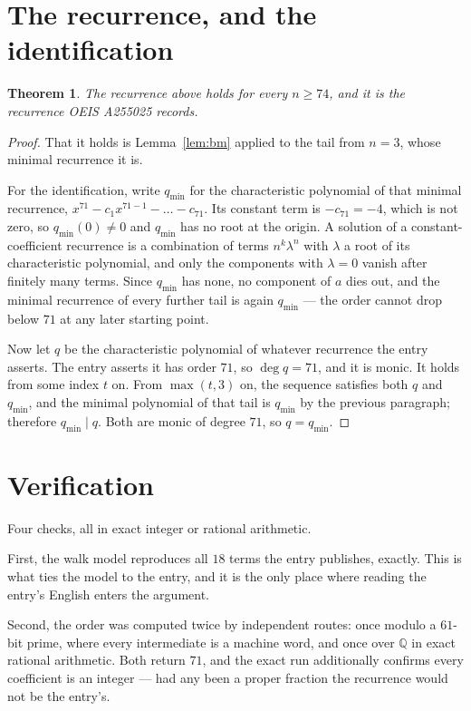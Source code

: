 \documentclass[11pt,a4paper]{article}
\theoremstyle{plain}
\newtheorem{theorem}{Theorem}
\theoremstyle{definition}
\begin{document}
\section{The recurrence, and the identification}

\begin{theorem}
The recurrence above holds for every $n\ge74$, and it is the recurrence OEIS A255025 records.
\end{theorem}

\begin{proof}
That it holds is Lemma~\ref{lem:bm} applied to the tail from $n=3$, whose minimal
recurrence it is.

For the identification, write $q_{\min}$ for the characteristic polynomial of that minimal
recurrence, $x^{71}-c_1x^{71-1}-\dots-c_{71}$. Its constant term is
$-c_{71}=-4$, which is not zero, so $q_{\min}(0)\neq0$ and $q_{\min}$ has no
root at the origin. A solution of a constant-coefficient recurrence is a combination of terms
$n^{k}\lambda^{n}$ with $\lambda$ a root of its characteristic polynomial, and only the
components with $\lambda=0$ vanish after finitely many terms. Since $q_{\min}$ has none, no
component of $a$ dies out, and the minimal recurrence of every further tail is again
$q_{\min}$ --- the order cannot drop below $71$ at any later starting point.

Now let $q$ be the characteristic polynomial of whatever recurrence the entry asserts. The
entry asserts it has order $71$, so $\deg q=71$, and it is monic. It holds from some
index $t$ on. From $\max(t,3)$ on, the sequence satisfies both $q$ and $q_{\min}$, and
the minimal polynomial of that tail is $q_{\min}$ by the previous paragraph; therefore
$q_{\min}\mid q$. Both are monic of degree $71$, so $q=q_{\min}$.
\end{proof}

\section{Verification}

Four checks, all in exact integer or rational arithmetic.

First, the walk model reproduces all $18$ terms the entry publishes, exactly. This is
what ties the model to the entry, and it is the only place where reading the entry's English
enters the argument.

Second, the order was computed twice by independent routes: once modulo a $61$-bit prime, where
every intermediate is a machine word, and once over $\mathbb{Q}$ in exact rational arithmetic.
Both return $71$, and the exact run additionally confirms every coefficient is an integer
--- had any been a proper fraction the recurrence would not be the entry's.
\end{document}
